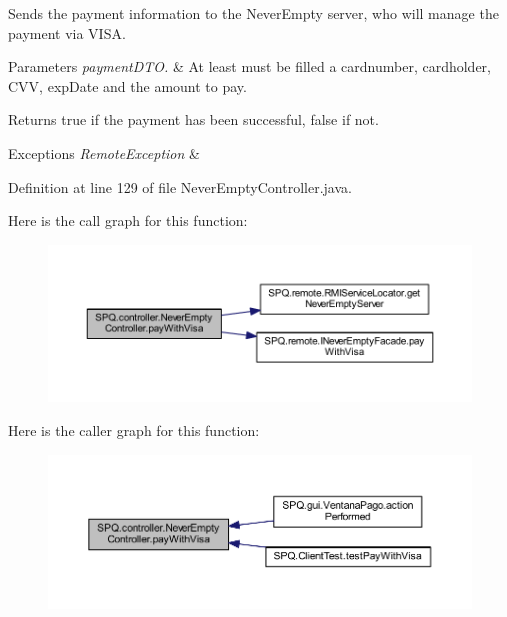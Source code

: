 Sends the payment information to the Never\+Empty server, who will manage the payment via V\+I\+SA. 
\begin{DoxyParams}{Parameters}
{\em payment\+D\+T\+O.} & At least must be filled a cardnumber, cardholder, C\+VV, exp\+Date and the amount to pay. \\
\hline
\end{DoxyParams}
\begin{DoxyReturn}{Returns}
true if the payment has been successful, false if not. 
\end{DoxyReturn}

\begin{DoxyExceptions}{Exceptions}
{\em Remote\+Exception} & \\
\hline
\end{DoxyExceptions}


Definition at line 129 of file Never\+Empty\+Controller.\+java.

Here is the call graph for this function\+:\nopagebreak
\begin{figure}[H]
\begin{center}
\leavevmode
\includegraphics[width=350pt]{class_s_p_q_1_1controller_1_1_never_empty_controller_a79b4d6042b76ad3aee7f11d104d813d6_cgraph}
\end{center}
\end{figure}
Here is the caller graph for this function\+:\nopagebreak
\begin{figure}[H]
\begin{center}
\leavevmode
\includegraphics[width=350pt]{class_s_p_q_1_1controller_1_1_never_empty_controller_a79b4d6042b76ad3aee7f11d104d813d6_icgraph}
\end{center}
\end{figure}
\mbox{\label{class_s_p_q_1_1controller_1_1_never_empty_controller_ad766d360d5d5c69d6e6d5b2953b27fac}} 
